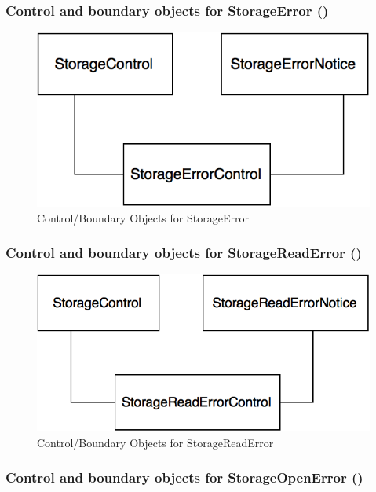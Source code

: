 \documentclass[12pt,letterpaper]{article}
\begin{document}
\subsubsection*{Control and boundary objects for StorageError (\storageerror{})}

\begin{figure}[H]
	\centering{}
	\includegraphics[scale=0.4]{imgs/cbod/storage-error.png}
	\caption{Control/Boundary Objects for StorageError}
\end{figure}

\subsubsection*{Control and boundary objects for StorageReadError (\storagereaderror{})}

\begin{figure}[H]
	\centering{}
	\includegraphics[scale=0.4]{imgs/cbod/storage-read-error.png}
	\caption{Control/Boundary Objects for StorageReadError}
\end{figure}

\subsubsection*{Control and boundary objects for StorageOpenError (\storageopenerror{})}
\end{document}
